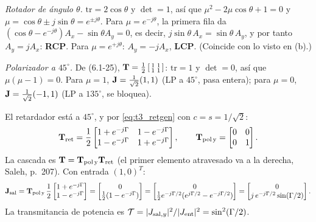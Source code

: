 \emph{Rotador de ángulo $\theta$.} $\mathrm{tr}=2\cos\theta$ y $\det=1$, así que
$\mu^2-2\mu\cos\theta+1=0$ y $\mu=\cos\theta\pm j\sin\theta=e^{\pm j\theta}$.
Para $\mu=e^{-j\theta}$, la primera fila da $(\cos\theta-e^{-j\theta})A_x-\sin\theta A_y=0$, es decir,
$j\sin\theta\,A_x=\sin\theta\,A_y$, y por tanto $A_y=jA_x$: \textbf{RCP}. Para
$\mu=e^{+j\theta}$: $A_y=-jA_x$, \textbf{LCP}. (Coincide con lo visto en (b).)

\emph{Polarizador a $45^\circ$.} De (6.1-25), $\mathbf T=\frac12\left[\begin{smallmatrix}1&1\\1&1\end{smallmatrix}\right]$:
$\mathrm{tr}=1$ y $\det=0$, así que $\mu(\mu-1)=0$. Para $\mu=1$, $\mathbf J=\frac{1}{\sqrt2}(1,1)$ (LP a $45^\circ$,
pasa entera); para $\mu=0$, $\mathbf J=\frac{1}{\sqrt2}(-1,1)$ (LP a $135^\circ$, se bloquea).

 El retardador está a $45^\circ$, y por \eqref{eq:t3_retgen} con $c=s=1/\sqrt2$:
\[
\mathbf T_{\rm ret}=\frac12\begin{bmatrix}1+e^{-j\Gamma} & 1-e^{-j\Gamma}\\ 1-e^{-j\Gamma} & 1+e^{-j\Gamma}\end{bmatrix},
\qquad \mathbf T_{\rm pol\,y}=\begin{bmatrix}0&0\\0&1\end{bmatrix}.
\]
La cascada es $\mathbf T=\mathbf T_{\rm pol\,y}\mathbf T_{\rm ret}$ (el primer elemento atravesado va a la derecha, Saleh, p.~207).
Con entrada $(1,0)^T$:
\[
\mathbf J_{\rm sal}=\mathbf T_{\rm pol\,y}\,\frac12\begin{bmatrix}1+e^{-j\Gamma}\\ 1-e^{-j\Gamma}\end{bmatrix}
=\begin{bmatrix}0\\ \tfrac12(1-e^{-j\Gamma})\end{bmatrix}
=\begin{bmatrix}0\\ \tfrac12e^{-j\Gamma/2}(e^{j\Gamma/2}-e^{-j\Gamma/2})\end{bmatrix}
=\begin{bmatrix}0\\ j\,e^{-j\Gamma/2}\sin(\Gamma/2)\end{bmatrix}.
\]
La transmitancia de potencia es $\mathcal T=|J_{{\rm sal},y}|^2/|J_{\rm ent}|^2=\sin^2(\Gamma/2)$.

